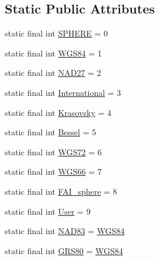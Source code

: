 \subsection*{Static Public Attributes}
\begin{DoxyCompactItemize}
\item 
static final int \hyperlink{classpt_1_1lsts_1_1asa_1_1pos_1_1GISCoordinate_a37209c94dad760ec7c19c97e21f9aef1}{S\+P\+H\+E\+R\+E} = 0
\item 
static final int \hyperlink{classpt_1_1lsts_1_1asa_1_1pos_1_1GISCoordinate_aa8ffa67276523ca258e07ef16e01dc2b}{W\+G\+S84} = 1
\item 
static final int \hyperlink{classpt_1_1lsts_1_1asa_1_1pos_1_1GISCoordinate_ac814b047b2b84a555eb92bc445390689}{N\+A\+D27} = 2
\item 
static final int \hyperlink{classpt_1_1lsts_1_1asa_1_1pos_1_1GISCoordinate_aa9a138dbdfc4e5213d000b910d78bebe}{International} = 3
\item 
static final int \hyperlink{classpt_1_1lsts_1_1asa_1_1pos_1_1GISCoordinate_a20fbe0542ed7919e5c334e2ad914142b}{Krasovsky} = 4
\item 
static final int \hyperlink{classpt_1_1lsts_1_1asa_1_1pos_1_1GISCoordinate_a84f793fffc95437d28e1085618e22458}{Bessel} = 5
\item 
static final int \hyperlink{classpt_1_1lsts_1_1asa_1_1pos_1_1GISCoordinate_af024d2e389e77f4e7bd6ae073c08cf45}{W\+G\+S72} = 6
\item 
static final int \hyperlink{classpt_1_1lsts_1_1asa_1_1pos_1_1GISCoordinate_ae3dfc45434ba52ac68c34f5b3d0f9808}{W\+G\+S66} = 7
\item 
static final int \hyperlink{classpt_1_1lsts_1_1asa_1_1pos_1_1GISCoordinate_abfc0deced71decc2760cf956f6a9aafb}{F\+A\+I\+\_\+sphere} = 8
\item 
static final int \hyperlink{classpt_1_1lsts_1_1asa_1_1pos_1_1GISCoordinate_aff5f45f236088c4e600c706a670a18e6}{User} = 9
\item 
static final int \hyperlink{classpt_1_1lsts_1_1asa_1_1pos_1_1GISCoordinate_a83bb3a9385e7da0d7df20bf556b8c97c}{N\+A\+D83} = \hyperlink{classpt_1_1lsts_1_1asa_1_1pos_1_1GISCoordinate_aa8ffa67276523ca258e07ef16e01dc2b}{W\+G\+S84}
\item 
static final int \hyperlink{classpt_1_1lsts_1_1asa_1_1pos_1_1GISCoordinate_abb8c183e4c3d7410cef70decc37f6f77}{G\+R\+S80} = \hyperlink{classpt_1_1lsts_1_1asa_1_1pos_1_1GISCoordinate_aa8ffa67276523ca258e07ef16e01dc2b}{W\+G\+S84}
\end{DoxyCompactItemize}
